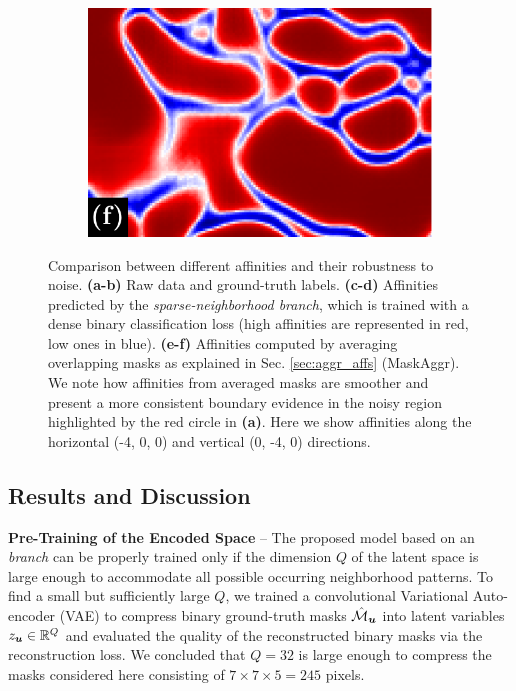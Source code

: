 \begin{figure}[t]
\begin{subfigure}[t]{0.32\textwidth}
\includegraphics[width=1.0\linewidth,trim=0in 0in 0in 0.2in,clip]{./figs/aff_compare_designer/mask_1.pdf} %
\end{subfigure}
\caption{Comparison between different affinities and their robustness to noise. \textbf{\mbox{(a-b)}} Raw data and ground-truth labels. \textbf{(c-d)} Affinities predicted by the \emph{sparse-neighborhood branch}, which is trained with a dense binary classification loss (high affinities are represented in red, low ones in blue). \textbf{(e-f)} Affinities computed by averaging overlapping masks as explained in Sec. \ref{sec:aggr_affs} (MaskAggr). We note how affinities from averaged masks are smoother and present a more consistent boundary evidence in the noisy region highlighted by the red circle in \textbf{(a)}. Here we show affinities along the horizontal (-4, 0, 0) and vertical (0, -4, 0) directions.}\label{fig:affs_comparison}
\end{figure}

\subsection{Results and Discussion}

\textbf{Pre-Training of the Encoded Space} -- The proposed model based on an \emph{\encBr branch} can be properly trained only if the dimension $Q$ of the latent space is large enough to accommodate all possible occurring neighborhood patterns. 
To find a small but sufficiently large $Q$, we trained a convolutional Variational Auto-encoder (VAE) \cite{kingma2013auto,rezende2014stochastic} to compress binary ground-truth \maskname masks $\hat{\mathcal{M}}_{\bm{u}}$ into latent variables $z_{\bm{u}}\in \mathbb{R}^Q$ and evaluated the quality of the reconstructed binary masks via the reconstruction loss. We concluded that $Q=32$ is large enough to compress the masks considered here consisting of $7\times 7 \times 5=245$ pixels. 


